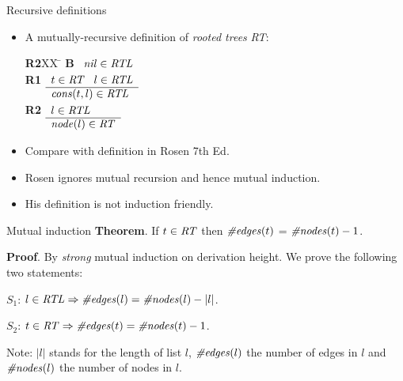 \documentclass[style=sailor,size=12pt]{powerdot}
\begin{document}
\begin{wideslide}[bm=,toc=]{Recursive definitions}
\begin{itemize}
\item A mutually-recursive definition of {\em rooted trees\/} {\em RT\/}:
\begin{tabbing}
{\bf R2}XX \=  \kill
{\bf B} \>
        \(\begin{array}[t]{l}
        \mbox{\it nil\/}\in\mbox{\it RTL\/}
        \end{array}\) \\[2ex]
{\bf R1} \>
        \(\begin{array}[t]{l}
        t\in\mbox{\it RT\/}\;\;\;l\in\mbox{\it RTL\/} \\
        \hline
        \mbox{\it cons\/}(t,l)\in\mbox{\it RTL\/}
        \end{array}\) \\[2ex]
{\bf R2} \>
        \(\begin{array}[t]{l}
        l\in\mbox{\it RTL\/} \\
        \hline
        \mbox{\it node\/}(l)\in\mbox{\it RT\/}
        \end{array}\)
\end{tabbing}
\item Compare with definition in Rosen 7th Ed.
\item Rosen ignores mutual recursion and hence mutual induction.
\item His definition is not induction friendly.
\end{itemize}
\end{wideslide}

\begin{wideslide}[bm=,toc=]{Mutual induction}
{\bf Theorem}. If $t\in\mbox{\it RT\/}$ then $\mbox{\it \#edges\/}(t)$ = $\mbox{\it \#nodes\/}(t) - 1$.
\vspace{1em}

{\bf Proof}.  By {\em strong\/} mutual induction on derivation height. 
We prove the following two statements:
\vspace{1em}

$S_1$: $l\in \mbox{\it RTL\/}\Rightarrow \mbox{\it \#edges\/}(l) = \mbox{\it \#nodes\/}(l) - |l|$.

$S_2$: $t\in \mbox{\it RT\/}\Rightarrow \mbox{\it \#edges\/}(t) = \mbox{\it \#nodes\/}(t) - 1$.

\vspace{2em}
Note: $|l|$ stands for the length of list $l$, $\mbox{\it \#edges\/}(l)$ the number of edges in $l$
and $\mbox{\it \#nodes\/}(l)$ the number of nodes in $l$.
\end{wideslide}
\end{document}
